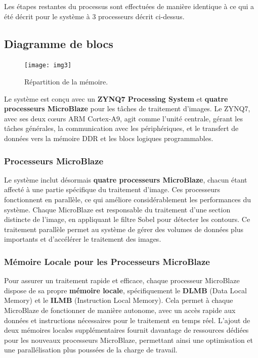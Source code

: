 \documentclass[../CSC_5RO07_TA.tex]{subfiles}
\begin{document}
Les étapes restantes du processus sont effectuées de manière identique à ce qui a été décrit pour le système à 3 processeurs décrit ci-dessus.

\subsection{Diagramme de blocs}

\begin{figure}[H]
    \centering
    \texttt{[image: img3]}
    \caption{Répartition de la mémoire.}
    \label{fig:9}
\end{figure}

Le système est conçu avec un \textbf{ZYNQ7 Processing System} et \textbf{quatre processeurs MicroBlaze} pour les tâches de traitement d'images. Le ZYNQ7, avec ses deux cœurs ARM Cortex-A9, agit comme l'unité centrale, gérant les tâches générales, la communication avec les périphériques, et le transfert de données vers la mémoire DDR et les blocs logiques programmables. 

\subsubsection{Processeurs MicroBlaze}  
Le système inclut désormais \textbf{quatre processeurs MicroBlaze}, chacun étant affecté à une partie spécifique du traitement d'image. Ces processeurs fonctionnent en parallèle, ce qui améliore considérablement les performances du système. Chaque MicroBlaze est responsable du traitement d'une section distincte de l'image, en appliquant le filtre Sobel pour détecter les contours. Ce traitement parallèle permet au système de gérer des volumes de données plus importants et d'accélérer le traitement des images.

\subsubsection{Mémoire Locale pour les Processeurs MicroBlaze}  
Pour assurer un traitement rapide et efficace, chaque processeur MicroBlaze dispose de sa propre \textbf{mémoire locale}, spécifiquement le \textbf{DLMB} (Data Local Memory) et le \textbf{ILMB} (Instruction Local Memory). Cela permet à chaque MicroBlaze de fonctionner de manière autonome, avec un accès rapide aux données et instructions nécessaires pour le traitement en temps réel. L'ajout de deux mémoires locales supplémentaires fournit davantage de ressources dédiées pour les nouveaux processeurs MicroBlaze, permettant ainsi une optimisation et une parallélisation plus poussées de la charge de travail.
\end{document}
